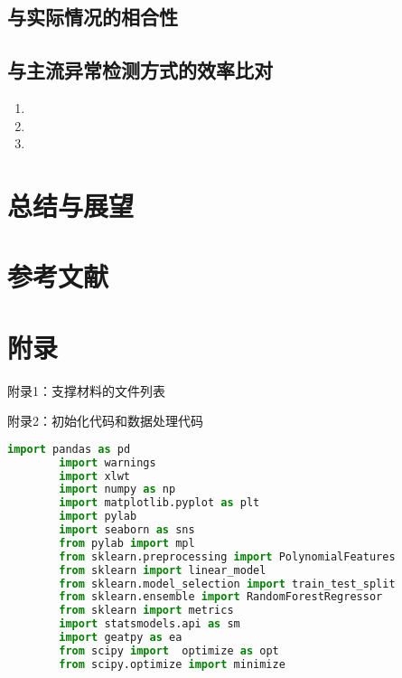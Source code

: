 \documentclass[a4paper]{article}
\begin{document}
	\subsection{与实际情况的相合性}

	
	\subsection{与主流异常检测方式的效率比对}
	\begin{enumerate}
		\item 
		\item 
		\item 
	\end{enumerate}
	
	\section{总结与展望}
	
	\section{参考文献}
	\vspace{-2em} %
	\begin{thebibliography}{9}  
	\end{thebibliography}
	
	\newpage
	\section*{附录}
	
	附录1：支撑材料的文件列表
	
	
	附录2：初始化代码和数据处理代码
	\begin{lstlisting}[language=python,columns=fullflexible,frame=shadowbox]
		import pandas as pd
		import warnings
		import xlwt
		import numpy as np
		import matplotlib.pyplot as plt
		import pylab
		import seaborn as sns
		from pylab import mpl
		from sklearn.preprocessing import PolynomialFeatures
		from sklearn import linear_model
		from sklearn.model_selection import train_test_split
		from sklearn.ensemble import RandomForestRegressor
		from sklearn import metrics
		import statsmodels.api as sm
		import geatpy as ea
		from scipy import  optimize as opt
		from scipy.optimize import minimize
	\end{lstlisting}
	
\end{document}
